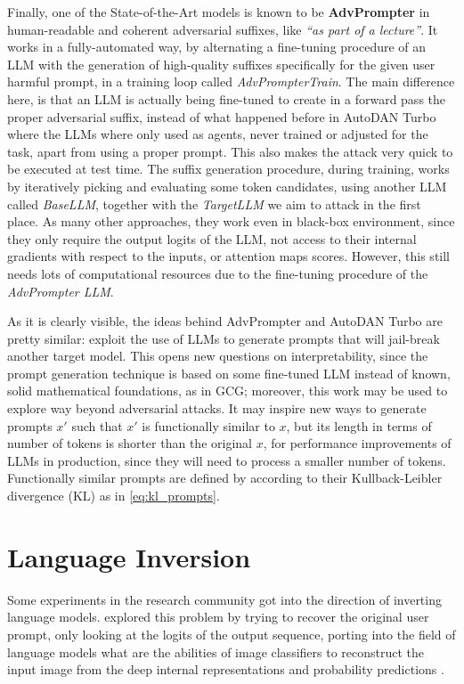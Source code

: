 \documentclass[../thesis]{subfiles}
\begin{document}
Finally, one of the State-of-the-Art models is known to be \textbf{AdvPrompter} \citep{paulus2024advprompterfastadaptiveadversarial} in human-readable and coherent adversarial suffixes, like \emph{``as part of a lecture''}.
It works in a fully-automated way, by alternating a fine-tuning procedure of an LLM with the generation of high-quality suffixes specifically for the given user harmful prompt,
in a training loop called \emph{AdvPrompterTrain}.
The main difference here, is that an LLM is actually being fine-tuned to create in a forward pass the proper adversarial suffix, instead of what happened before in AutoDAN Turbo where the LLMs where only used as agents, never trained or adjusted for the task, apart from using a proper prompt. This also makes the attack very quick to be executed at test time.
The suffix generation procedure, during training, works by iteratively picking and evaluating some token candidates, using another LLM called \emph{BaseLLM}, together with the \emph{TargetLLM} we aim to attack in the first place.
As many other approaches, they work even in black-box environment, since they only require the output logits of the LLM, not access to their internal gradients with respect to the inputs, or attention maps scores. However, this still needs lots of computational resources due to the fine-tuning procedure of the \emph{AdvPrompter LLM}.

As it is clearly visible, the ideas behind AdvPrompter and AutoDAN Turbo are pretty similar:
exploit the use of LLMs to generate prompts that will jail-break another target model.
This opens new questions on interpretability, since the prompt generation technique is based on some fine-tuned LLM instead of known, solid mathematical foundations, as in GCG;
moreover, this work may be used to explore way beyond adversarial attacks. It may inspire new ways to generate prompts $x'$ such that $x'$ is functionally similar to $x$, but its length in terms of number of tokens is shorter than the original $x$, for performance improvements of LLMs in production, since they will need to process a smaller number of tokens.
Functionally similar prompts are defined by \citeauthor{promptshaveeviltwins} according to their Kullback-Leibler divergence (KL) as in \cref{eq:kl_prompts}.


\section{Language Inversion}
Some experiments in the research community got into the direction of inverting language models.
\citeauthor{morris2023languagemodelinversion} explored this problem by trying to recover the original user prompt, only looking at the logits of the output sequence,
porting into the field of language models what are the abilities of image classifiers to reconstruct the input image from the deep internal representations and probability predictions \citep{dosovitskiy2016invertingcnn}.
\end{document}
